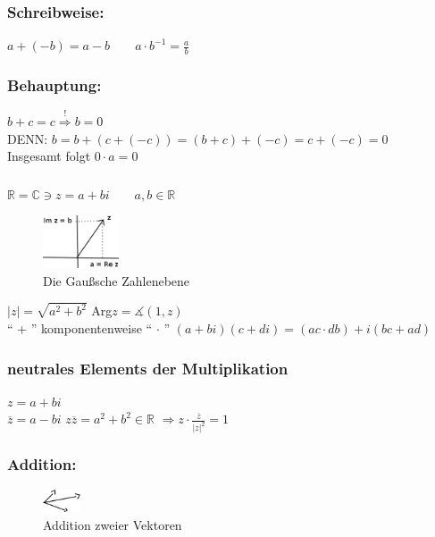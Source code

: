 \subsubsection{Schreibweise:}
$ a+(-b) = a-b \qquad a\cdot b^{-1} = \frac{a}{b}$
%
%
%
\subsubsection{Behauptung:}
$b+c = c \mathop{\Rightarrow}\limits^{!} b = 0$\\
DENN: $b=b+(c+(-c))=(b+c)+(-c)=c+(-c)=0$\\
Insgesamt folgt $0 \cdot a = 0$  \\
%
%
%
\subsubsection{ }
$\mathbb{R} = \mathbb{C} \ni z = a+bi \qquad a,b \in \mathbb{R}$
\begin{figure}[H]
\centering
\includegraphics[width=0.2\textwidth]{mainmatter/chapter3/pics/gauszschezahlenebene.png}
\caption{Die Gaußsche Zahlenebene}
\end{figure}
$\vert z \vert = \sqrt{a^{2}+b^{2}}$ \qquad Arg$z=\measuredangle (1,z)$\\
 "` + "' komponentenweise "` $\cdot$ "' $(a+bi)(c+di)=(ac\cdot db)+i(bc+ad)$\\
%
%
%
\subsubsection{neutrales Elements der Multiplikation}
$z=a+bi$\\
$\overline{z}=a-bi$
$z\overline{z}=a^{2}+b^{2} \in  \mathbb{R}$
$\Rightarrow z\cdot \frac{\overline{z}}{\vert z \vert^{2}} = 1$
%
%
%
\subsubsection{Addition:}
\begin{figure}[H]
\centering
\includegraphics[width=0.1\textwidth]{mainmatter/chapter3/pics/addition.png}
\caption{Addition zweier Vektoren}
\end{figure}
%
%
%
